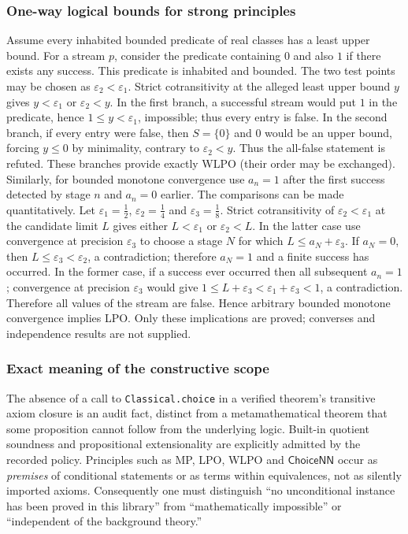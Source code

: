 \documentclass[11pt,reqno]{amsart}
\theoremstyle{definition}\newtheorem{definition}[theorem]{Definition}
\theoremstyle{remark}\newtheorem{remark}[theorem]{Remark}
\newcommand{\eps}{\varepsilon}
\begin{document}
\subsubsection*{One-way logical bounds for strong principles}\label{supp:14-4}
Assume every inhabited bounded predicate of real classes has a least upper bound. For a stream $p$, consider the predicate containing $0$ and also $1$ if there exists any success. This predicate is inhabited and bounded. The two test points may be chosen as $\eps_2<\eps_1$. Strict cotransitivity at the alleged least upper bound $y$ gives $y<\eps_1$ or $\eps_2<y$. In the first branch, a successful stream would put $1$ in the predicate, hence $1\le y<\eps_1$, impossible; thus every entry is false. In the second branch, if every entry were false, then $S=\{0\}$ and $0$ would be an upper bound, forcing $y\le0$ by minimality, contrary to $\eps_2<y$. Thus the all-false statement is refuted. These branches provide exactly WLPO (their order may be exchanged). Similarly, for bounded monotone convergence use $a_n=1$ after the first success detected by stage $n$ and $a_n=0$ earlier. The comparisons can be made quantitatively. Let $\eps_1=\frac12$, $\eps_2=\frac14$ and $\eps_3=\frac18$. Strict cotransitivity of $\eps_2<\eps_1$ at the candidate limit $L$ gives either $L<\eps_1$ or $\eps_2<L$. In the latter case use convergence at precision $\eps_3$ to choose a stage $N$ for which $L\le a_N+\eps_3$. If $a_N=0$, then $L\le\eps_3<\eps_2$, a contradiction; therefore $a_N=1$ and a finite success has occurred. In the former case, if a success ever occurred then all subsequent $a_n=1$; convergence at precision $\eps_3$ would give $1\le L+\eps_3<\eps_1+\eps_3<1$, a contradiction. Therefore all values of the stream are false. Hence arbitrary bounded monotone convergence implies LPO. Only these implications are proved; converses and independence results are not supplied.
\medskip
\medskip
\subsubsection*{Exact meaning of the constructive scope}\label{supp:14-5}
The absence of a call to \texttt{Classical.choice} in a verified theorem's transitive axiom closure is an audit fact, distinct from a metamathematical theorem that some proposition cannot follow from the underlying logic. Built-in quotient soundness and propositional extensionality are explicitly admitted by the recorded policy. Principles such as MP, LPO, WLPO and $\mathsf{ChoiceNN}$ occur as \emph{premises} of conditional statements or as terms within equivalences, not as silently imported axioms. Consequently one must distinguish ``no unconditional instance has been proved in this library'' from ``mathematically impossible'' or ``independent of the background theory.''
\medskip
\end{document}

